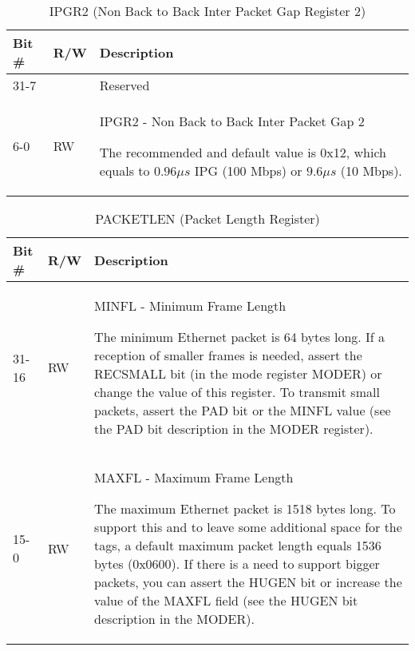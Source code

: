 \begin{table}[H]
  \centering
  \begin{tabularx}{\textwidth}{|l|l|X|}
    
    \hline
    \rowcolor{iob-green}
    {\bf Bit \#} & {\bf R/W} & {\bf Description} \\ \hline

    31-7   &   & Reserved \\ \hline
    \rowcolor{iob-blue}
    6-0      & RW & IPGR2 - Non Back to Back Inter Packet Gap 2

                The recommended and default value is 0x12, which equals to $0.96
                \mu s$ IPG (100 Mbps) or $9.6 \mu s$ (10 Mbps).\\ \hline
  \end{tabularx}
    \caption{IPGR2 (Non Back to Back Inter Packet Gap Register 2)}
  \label{swreg_details:ipgr2}
\end{table}

\begin{table}[H]
  \centering
  \begin{tabularx}{\textwidth}{|l|l|X|}
    
    \hline
    \rowcolor{iob-green}
    {\bf Bit \#} & {\bf R/W} & {\bf Description} \\ \hline

    31-16   & RW  & MINFL - Minimum Frame Length 

                The minimum Ethernet packet is 64 bytes long. If a reception of
                smaller frames is needed, assert the RECSMALL bit (in the mode
                register MODER) or change the value of this register. To
                transmit small packets, assert the PAD bit or the MINFL value
                (see the PAD bit description in the MODER register). \\ \hline
    \rowcolor{iob-blue}
    15-0   & RW  & MAXFL - Maximum Frame Length 

                The maximum Ethernet packet is 1518 bytes long. To support this
                and to leave some additional space for the tags, a default
                maximum packet length equals 1536 bytes (0x0600). If there is a
                need to support bigger packets, you can assert the HUGEN bit or
                increase the value of the MAXFL field (see the HUGEN bit
                description in the MODER).\\ \hline
  \end{tabularx}
    \caption{PACKETLEN (Packet Length Register)}
  \label{swreg_details:packetlen}
\end{table}

